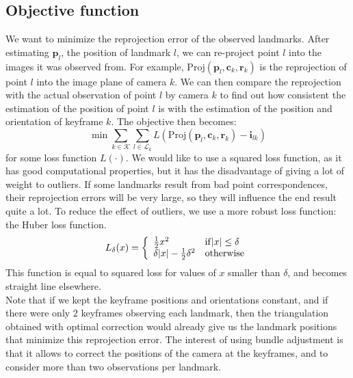 \subsection{Objective function} \label{sec:loss}
We want to minimize the reprojection error of the observed landmarks. After estimating $\mathbf{p}_l$, the position of landmark $l$, we can re-project point $l$ into the images it was observed from. For example, $\mathrm{Proj}(\mathbf{p}_l,\mathbf{c}_k,\mathbf{r}_k)$ is the reprojection of point $l$ into the image plane of camera $k$. We can then compare the reprojection with the actual observation of point $l$ by camera $k$ to find out how consistent the estimation of the position of point $l$ is with the estimation of the position and orientation of keyframe $k$. The objective then becomes:
\begin{equation} \label{eq:objfunc}
  \min \sum_{k\in\mathcal{K}}\sum_{l\in\mathcal{L}_k} L(\mathrm{Proj}(\mathbf{p}_l,\mathbf{c}_k,\mathbf{r}_k) - \mathbf{i}_{lk})
\end{equation}
for some loss function $L(\cdot)$. We would like to use a squared loss function, as it has good computational properties, but it has the disadvantage of giving a lot of weight to outliers. If some landmarks result from bad point correspondences, their reprojection errors will be very large, so they will influence the end result quite a lot. To reduce the effect of outliers, we use a more robust loss function: the Huber loss function.
\begin{equation} \label{eq:huber}
  L_\delta(x) = \left\{ \begin{array}{l l}
    \frac{1}{2} x^2 & \mathrm{if } |x| \leq \delta \\
    \delta|x| - \frac{1}{2}\delta^2 & \mathrm{otherwise} \end{array} \right.
\end{equation}
This function is equal to squared loss for values of $x$ smaller than $\delta$, and becomes straight line elsewhere. \\

Note that if we kept the keyframe positions and orientations constant, and if there were only 2 keyframes observing each landmark, then the triangulation obtained with optimal correction would already give us the landmark positions that minimize this reprojection error. The interest of using bundle adjustment is that it allows to correct the positions of the camera at the keyframes, and to consider more than two observations per landmark.

